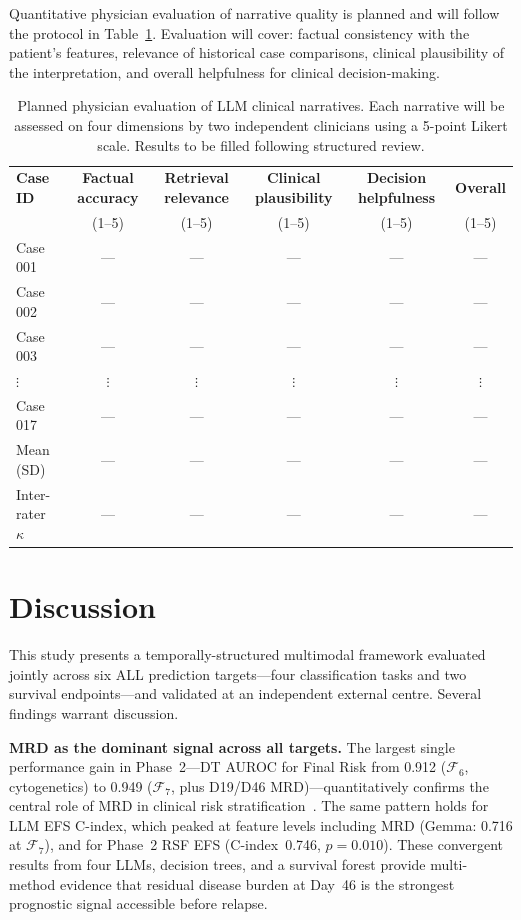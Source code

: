 \documentclass[pdflatex,sn-nature]{sn-jnl}
\begin{document}
Quantitative physician evaluation of narrative quality is planned
and will follow the protocol in Table~\ref{tab:narrative_eval}.
Evaluation will cover: factual consistency with the patient's features,
relevance of historical case comparisons, clinical plausibility of the
interpretation, and overall helpfulness for clinical decision-making.

\begin{table}[ht]
\caption{Planned physician evaluation of LLM clinical narratives.
Each narrative will be assessed on four dimensions by two independent
clinicians using a 5-point Likert scale.
Results to be filled following structured review.}
\label{tab:narrative_eval}
\centering
\small
\begin{tabular}{lccccc}
\toprule
\textbf{Case ID}
  & \textbf{Factual accuracy}
  & \textbf{Retrieval relevance}
  & \textbf{Clinical plausibility}
  & \textbf{Decision helpfulness}
  & \textbf{Overall} \\
  & (1--5) & (1--5) & (1--5) & (1--5) & (1--5) \\
\midrule
Case 001 & — & — & — & — & — \\
Case 002 & — & — & — & — & — \\
Case 003 & — & — & — & — & — \\
$\vdots$ & $\vdots$ & $\vdots$ & $\vdots$ & $\vdots$ & $\vdots$ \\
Case 017 & — & — & — & — & — \\
\midrule
Mean (SD) & — & — & — & — & — \\
Inter-rater $\kappa$ & — & — & — & — & — \\
\bottomrule
\end{tabular}
\end{table}

\section{Discussion}\label{sec:discussion}

This study presents a temporally-structured multimodal framework
evaluated jointly across six ALL prediction targets—four classification
tasks and two survival endpoints—and validated at an independent
external centre.
Several findings warrant discussion.

\textbf{MRD as the dominant signal across all targets.}
The largest single performance gain in Phase~2—DT AUROC for Final Risk
from 0.912 ($\mathcal{F}_6$, cytogenetics) to 0.949 ($\mathcal{F}_7$,
plus D19/D46 MRD)—quantitatively confirms the central role of MRD
in clinical risk stratification~\cite{[CITE:Conter2010]}.
The same pattern holds for LLM EFS C-index, which peaked at feature
levels including MRD (Gemma: 0.716 at $\mathcal{F}_7$), and for
Phase~2 RSF EFS (C-index~0.746, $p=0.010$).
These convergent results from four LLMs, decision trees, and a survival
forest provide multi-method evidence that residual disease burden at
Day~46 is the strongest prognostic signal accessible before relapse.
\end{document}
